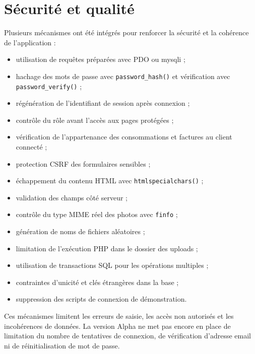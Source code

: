 \section{Sécurité et qualité}

Plusieurs mécanismes ont été intégrés pour renforcer la sécurité et la cohérence de l'application :

\begin{itemize}[leftmargin=*]
  \item utilisation de requêtes préparées avec PDO ou mysqli ;
  \item hachage des mots de passe avec \texttt{password\_hash()} et vérification avec \texttt{password\_verify()} ;
  \item régénération de l'identifiant de session après connexion ;
  \item contrôle du rôle avant l'accès aux pages protégées ;
  \item vérification de l'appartenance des consommations et factures au client connecté ;
  \item protection CSRF des formulaires sensibles ;
  \item échappement du contenu HTML avec \texttt{htmlspecialchars()} ;
  \item validation des champs côté serveur ;
  \item contrôle du type MIME réel des photos avec \texttt{finfo} ;
  \item génération de noms de fichiers aléatoires ;
  \item limitation de l'exécution PHP dans le dossier des uploads ;
  \item utilisation de transactions SQL pour les opérations multiples ;
  \item contraintes d'unicité et clés étrangères dans la base ;
  \item suppression des scripts de connexion de démonstration.
\end{itemize}

Ces mécanismes limitent les erreurs de saisie, les accès non autorisés et les incohérences de données. La version Alpha ne met pas encore en place de limitation du nombre de tentatives de connexion, de vérification d'adresse email ni de réinitialisation de mot de passe.
